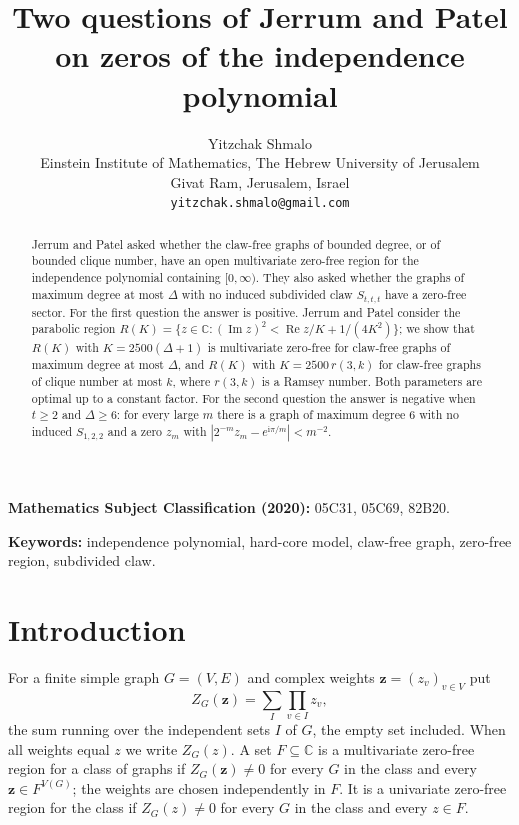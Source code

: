 \documentclass[11pt]{article}
\title{Two questions of Jerrum and Patel on zeros of the independence polynomial}
\author{Yitzchak Shmalo\\
Einstein Institute of Mathematics, The Hebrew University of Jerusalem\\
Givat Ram, Jerusalem, Israel\\
\texttt{yitzchak.shmalo@gmail.com}}
\date{}
\theoremstyle{remark}
\renewcommand{\Re}{\operatorname{Re}}
\renewcommand{\Im}{\operatorname{Im}}
\begin{document}
\maketitle

\begin{abstract}
Jerrum and Patel asked whether the claw-free graphs of bounded degree, or of bounded clique number, have an open
multivariate zero-free region for the independence polynomial containing $[0,\infty)$. They also asked whether the
graphs of maximum degree at most $\Delta$ with no induced subdivided claw $S_{t,t,t}$ have a zero-free sector. For the first question
the answer is positive. Jerrum and Patel consider the parabolic region
$R(K)=\{z\in\mathbb C:(\Im z)^2<\Re z/K+1/(4K^2)\}$; we show that $R(K)$ with $K=2500(\Delta+1)$ is multivariate
zero-free for claw-free graphs of maximum degree at most $\Delta$, and $R(K)$ with $K=2500\,r(3,k)$ for claw-free
graphs of clique number at most $k$, where $r(3,k)$ is a Ramsey number. Both parameters are optimal up to a constant factor. For the second question the answer is negative
when $t\ge2$ and $\Delta\ge6$: for every large $m$ there is a graph of maximum degree $6$ with no induced $S_{1,2,2}$
and a zero $z_m$ with $|2^{-m}z_m-e^{\mathrm i\pi/m}|<m^{-2}$.
\end{abstract}

\noindent\textbf{Mathematics Subject Classification (2020):} 05C31, 05C69, 82B20.

\noindent\textbf{Keywords:} independence polynomial, hard-core model, claw-free graph, zero-free region,
subdivided claw.

\section{Introduction}

For a finite simple graph $G=(V,E)$ and complex weights $\boldsymbol z=(z_v)_{v\in V}$ put
\[
Z_G(\boldsymbol z)=\sum_{I}\prod_{v\in I}z_v ,
\]
the sum running over the independent sets $I$ of $G$, the empty set included. When all weights equal $z$ we write
$Z_G(z)$. A set $F\subseteq\mathbb C$ is a multivariate zero-free region for a class of graphs if
$Z_G(\boldsymbol z)\ne0$ for every $G$ in the class and every $\boldsymbol z\in F^{V(G)}$; the weights are chosen
independently in $F$. It is a univariate zero-free region for the class if $Z_G(z)\ne0$ for every $G$ in the class and
every $z\in F$.
\end{document}
